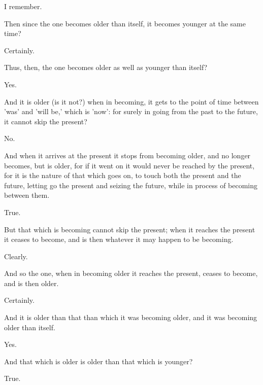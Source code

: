 \documentclass[11pt,letter]{article}
\begin{document}
\par  I remember.

\par  Then since the one becomes older than itself, it becomes younger at the same time?

\par  Certainly.

\par  Thus, then, the one becomes older as well as younger than itself?

\par  Yes.

\par  And it is older (is it not?) when in becoming, it gets to the point of time between 'was' and 'will be,' which is 'now': for surely in going from the past to the future, it cannot skip the present?

\par  No.

\par  And when it arrives at the present it stops from becoming older, and no longer becomes, but is older, for if it went on it would never be reached by the present, for it is the nature of that which goes on, to touch both the present and the future, letting go the present and seizing the future, while in process of becoming between them.

\par  True.

\par  But that which is becoming cannot skip the present; when it reaches the present it ceases to become, and is then whatever it may happen to be becoming.

\par  Clearly.

\par  And so the one, when in becoming older it reaches the present, ceases to become, and is then older.

\par  Certainly.

\par  And it is older than that than which it was becoming older, and it was becoming older than itself.

\par  Yes.

\par  And that which is older is older than that which is younger?

\par  True.
\end{document}
